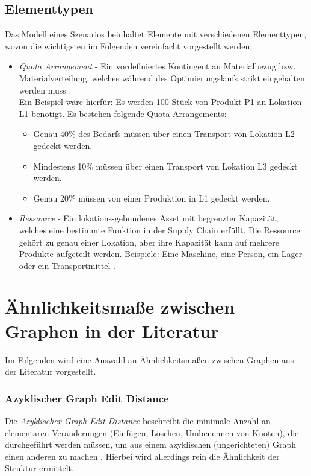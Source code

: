 \subsection{Elementtypen} \label{sec:elements}
Das Modell eines Szenarios beinhaltet Elemente mit verschiedenen Elementtypen, wovon die wichtigsten im Folgenden vereinfacht vorgestellt werden:

\begin{itemize}
\item \textit{Quota Arrangement} - Ein vordefiniertes Kontingent an Materialbezug bzw. Materialverteilung, welches während des Optimierungslaufs strikt eingehalten werden muss \cite{.20220812c}. \\ Ein Beispiel wäre hierfür: Es werden 100 Stück von Produkt P1 an Lokation L1 benötigt. Es bestehen folgende Quota Arrangements: \begin{itemize}
\item Genau 40\% des Bedarfs müssen über einen Transport von Lokation L2 gedeckt werden.
\item Mindestens 10\% müssen über einen Transport von Lokation L3 gedeckt werden.
\item Genau 20\% müssen von einer Produktion in L1 gedeckt werden.
\end{itemize} 
\item \textit{Ressource} - Ein lokations-gebundenes Asset mit begrenzter Kapazität, welches eine bestimmte Funktion in der Supply Chain erfüllt. Die Ressource gehört zu genau einer Lokation, aber ihre Kapazität kann auf mehrere Produkte aufgeteilt werden. Beispiele: Eine Maschine, eine Person, ein Lager oder ein Transportmittel \cite{.20220812b}.
\end{itemize}

\section{Ähnlichkeitsmaße zwischen Graphen in der Literatur} \label{sec:sim_lit}

Im Folgenden wird eine Auswahl an Ähnlichkeitsmaßen zwischen Graphen aus der Literatur vorgestellt.

\subsubsection{Azyklischer Graph Edit Distance} \label{sec:sim_edit_dist}

Die \textit{Azyklischer Graph Edit Distance} beschreibt die minimale Anzahl an elementaren Veränderungen (Einfügen, Löschen, Umbenennen von Knoten), die durchgeführt werden müssen, um aus einem azyklischen (ungerichteten) Graph einen anderen zu machen \cite{Zhang.1989}. Hierbei wird allerdings rein die Ähnlichkeit der Struktur ermittelt.

